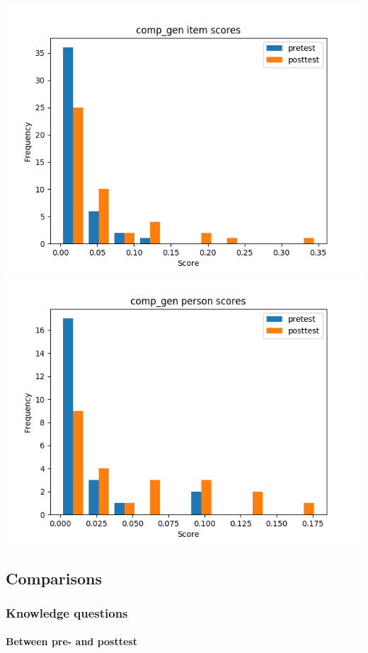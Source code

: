 \documentclass[]{article}
\begin{document}
\includegraphics{comp_gen_diff.png} \includegraphics{comp_gen_abil.png}

\subsection{Comparisons}\label{comparisons-1}

\subsubsection{Knowledge questions}\label{knowledge-questions-1}

\FloatBarrier
\paragraph{Between pre- and posttest}\label{between-pre--and-posttest}
\end{document}
